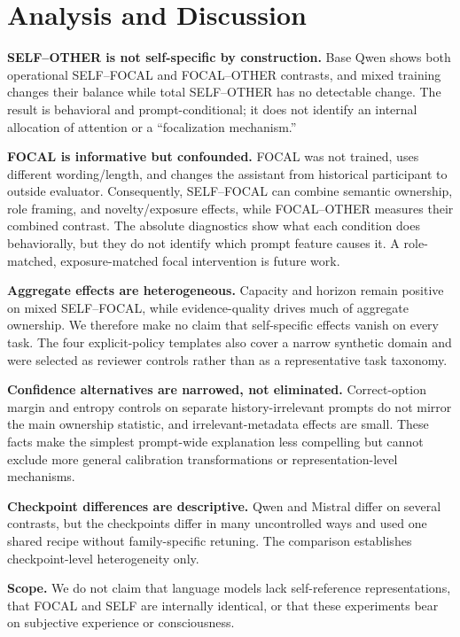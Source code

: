 \documentclass{article}
\begin{document}
\section{Analysis and Discussion}
\label{sec:discussion}

\textbf{SELF--OTHER is not self-specific by construction.} Base Qwen shows both operational SELF--FOCAL and FOCAL--OTHER contrasts, and mixed training changes their balance while total SELF--OTHER has no detectable change. The result is behavioral and prompt-conditional; it does not identify an internal allocation of attention or a ``focalization mechanism.''

\textbf{FOCAL is informative but confounded.} FOCAL was not trained, uses different wording/length, and changes the assistant from historical participant to outside evaluator. Consequently, SELF--FOCAL can combine semantic ownership, role framing, and novelty/exposure effects, while FOCAL--OTHER measures their combined contrast. The absolute diagnostics show what each condition does behaviorally, but they do not identify which prompt feature causes it. A role-matched, exposure-matched focal intervention is future work.

\textbf{Aggregate effects are heterogeneous.} Capacity and horizon remain positive on mixed SELF--FOCAL, while evidence-quality drives much of aggregate ownership. We therefore make no claim that self-specific effects vanish on every task. The four explicit-policy templates also cover a narrow synthetic domain and were selected as reviewer controls rather than as a representative task taxonomy.

\textbf{Confidence alternatives are narrowed, not eliminated.} Correct-option margin and entropy controls on separate history-irrelevant prompts do not mirror the main ownership statistic, and irrelevant-metadata effects are small. These facts make the simplest prompt-wide explanation less compelling but cannot exclude more general calibration transformations or representation-level mechanisms.

\textbf{Checkpoint differences are descriptive.} Qwen and Mistral differ on several contrasts, but the checkpoints differ in many uncontrolled ways and used one shared recipe without family-specific retuning. The comparison establishes checkpoint-level heterogeneity only.

\textbf{Scope.} We do not claim that language models lack self-reference representations, that FOCAL and SELF are internally identical, or that these experiments bear on subjective experience or consciousness.
\end{document}
